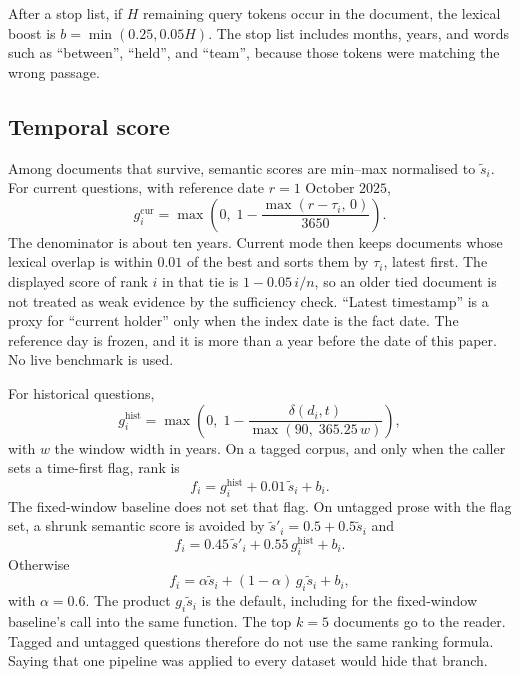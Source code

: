 \documentclass[11pt]{article}
\begin{document}
After a stop list, if $H$ remaining query tokens occur in the document, the lexical boost is $b=\min(0.25, 0.05H)$.
The stop list includes months, years, and words such as ``between'', ``held'', and ``team'', because those tokens were matching the wrong passage.

\subsection{Temporal score}

Among documents that survive, semantic scores are min--max normalised to $\tilde{s}_i$.
For current questions, with reference date $r=\text{1 October 2025}$,
\begin{equation}
g^{\mathrm{cur}}_i = \max\left(0,\; 1 - \frac{\max(r-\tau_i,\, 0)}{3650}\right).
\label{eq:cur}
\end{equation}
The denominator is about ten years.
Current mode then keeps documents whose lexical overlap is within $0.01$ of the best and sorts them by $\tau_i$, latest first.
The displayed score of rank $i$ in that tie is $1-0.05\,i/n$, so an older tied document is not treated as weak evidence by the sufficiency check.
``Latest timestamp'' is a proxy for ``current holder'' only when the index date is the fact date.
The reference day is frozen, and it is more than a year before the date of this paper.
No live benchmark is used.

For historical questions,
\begin{equation}
g^{\mathrm{hist}}_i
= \max\left(0,\;
1 - \frac{\delta(d_i, t)}{\max(90,\; 365.25\,w)}
\right),
\label{eq:hist}
\end{equation}
with $w$ the window width in years.
On a tagged corpus, and only when the caller sets a time-first flag, rank is
\begin{equation}
f_i = g^{\mathrm{hist}}_i + 0.01\,\tilde{s}_i + b_i .
\label{eq:timefirst}
\end{equation}
The fixed-window baseline does not set that flag.
On untagged prose with the flag set, a shrunk semantic score is avoided by $\tilde{s}'_i=0.5+0.5\tilde{s}_i$ and
\begin{equation}
f_i = 0.45\,\tilde{s}'_i + 0.55\,g^{\mathrm{hist}}_i + b_i .
\label{eq:untagged}
\end{equation}
Otherwise
\begin{equation}
f_i = \alpha \tilde{s}_i + (1-\alpha)\,g_i\tilde{s}_i + b_i ,
\label{eq:gate}
\end{equation}
with $\alpha=0.6$.
The product $g_i\tilde{s}_i$ is the default, including for the fixed-window baseline's call into the same function.
The top $k=5$ documents go to the reader.
Tagged and untagged questions therefore do not use the same ranking formula.
Saying that one pipeline was applied to every dataset would hide that branch.
\end{document}
